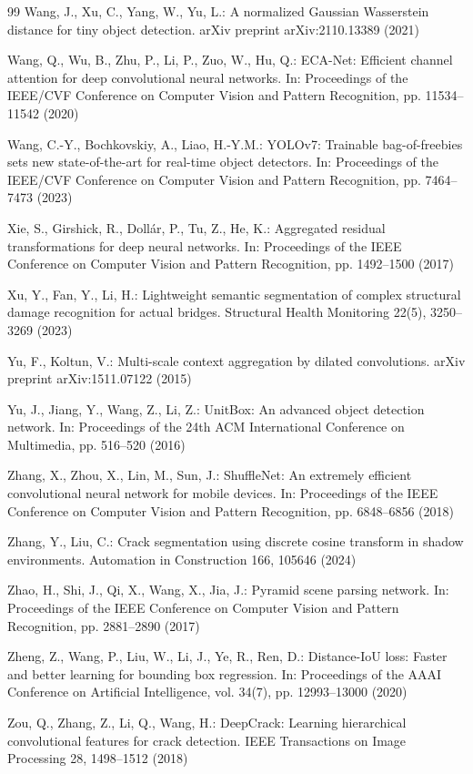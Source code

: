 \documentclass[twocolumn]{sn-jnl}
\begin{document}
\begin{thebibliography}{99}
		Wang, J., Xu, C., Yang, W., Yu, L.: A normalized Gaussian Wasserstein distance for tiny object detection. arXiv preprint arXiv:2110.13389 (2021)
		
		Wang, Q., Wu, B., Zhu, P., Li, P., Zuo, W., Hu, Q.: ECA-Net: Efficient channel attention for deep convolutional neural networks. In: Proceedings of the IEEE/CVF Conference on Computer Vision and Pattern Recognition, pp. 11534–11542 (2020)
		
		Wang, C.-Y., Bochkovskiy, A., Liao, H.-Y.M.: YOLOv7: Trainable bag-of-freebies sets new state-of-the-art for real-time object detectors. In: Proceedings of the IEEE/CVF Conference on Computer Vision and Pattern Recognition, pp. 7464–7473 (2023)
		
		Xie, S., Girshick, R., Dollár, P., Tu, Z., He, K.: Aggregated residual transformations for deep neural networks. In: Proceedings of the IEEE Conference on Computer Vision and Pattern Recognition, pp. 1492–1500 (2017)
		
		Xu, Y., Fan, Y., Li, H.: Lightweight semantic segmentation of complex structural damage recognition for actual bridges. Structural Health Monitoring 22(5), 3250–3269 (2023)
		
		Yu, F., Koltun, V.: Multi-scale context aggregation by dilated convolutions. arXiv preprint arXiv:1511.07122 (2015)
		
		Yu, J., Jiang, Y., Wang, Z., Li, Z.: UnitBox: An advanced object detection network. In: Proceedings of the 24th ACM International Conference on Multimedia, pp. 516–520 (2016)
		
		Zhang, X., Zhou, X., Lin, M., Sun, J.: ShuffleNet: An extremely efficient convolutional neural network for mobile devices. In: Proceedings of the IEEE Conference on Computer Vision and Pattern Recognition, pp. 6848–6856 (2018)
		
		Zhang, Y., Liu, C.: Crack segmentation using discrete cosine transform in shadow environments. Automation in Construction 166, 105646 (2024)
		
		Zhao, H., Shi, J., Qi, X., Wang, X., Jia, J.: Pyramid scene parsing network. In: Proceedings of the IEEE Conference on Computer Vision and Pattern Recognition, pp. 2881–2890 (2017)
		
		Zheng, Z., Wang, P., Liu, W., Li, J., Ye, R., Ren, D.: Distance-IoU loss: Faster and better learning for bounding box regression. In: Proceedings of the AAAI Conference on Artificial Intelligence, vol. 34(7), pp. 12993–13000 (2020)
		
		Zou, Q., Zhang, Z., Li, Q., Wang, H.: DeepCrack: Learning hierarchical convolutional features for crack detection. IEEE Transactions on Image Processing 28, 1498–1512 (2018)
		
	\end{thebibliography}
	
\end{document}

